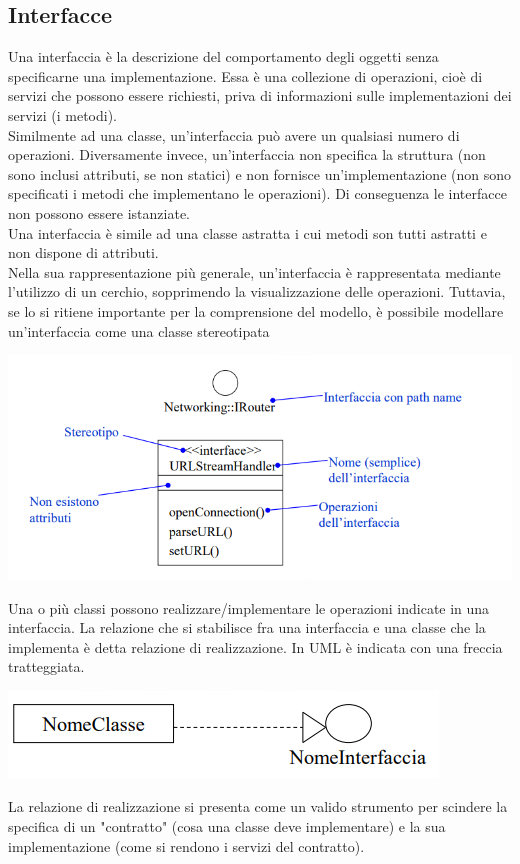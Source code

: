 \documentclass{article}
\begin{document}
	\subsection{Interfacce}
	Una interfaccia è la descrizione del comportamento degli oggetti senza specificarne una implementazione. Essa è una collezione di operazioni, cioè di servizi che possono essere richiesti, priva di informazioni sulle implementazioni dei servizi (i metodi).
	\vspace{\baselineskip} \\
	Similmente ad una classe, un'interfaccia può avere un qualsiasi numero di operazioni. Diversamente invece, un'interfaccia non specifica la struttura (non sono inclusi attributi, se non statici) e non fornisce un'implementazione (non sono specificati i metodi che implementano le operazioni). Di conseguenza le interfacce non possono essere istanziate.
	\vspace{\baselineskip} \\
	Una interfaccia è simile ad una classe astratta i cui metodi son tutti astratti e non dispone di attributi.
	\vspace{\baselineskip} \\
	Nella sua rappresentazione più generale, un'interfaccia è rappresentata mediante l'utilizzo di un cerchio, sopprimendo la visualizzazione delle operazioni. Tuttavia, se lo si ritiene importante per la comprensione del modello, è possibile modellare un'interfaccia come una classe stereotipata
	\begin{center}
		\includegraphics[scale=0.5]{assets/interfacce.png}
	\end{center}
	Una o più classi possono realizzare/implementare le operazioni indicate in una interfaccia. La relazione che si stabilisce fra una interfaccia e una classe che la implementa è detta relazione di realizzazione. In UML è indicata con una freccia tratteggiata.
	\begin{center}
		\includegraphics[scale=0.5]{assets/relazione_realizzazione_esempio.png}
	\end{center}
	La relazione di realizzazione si presenta come un valido strumento per scindere la specifica di un "contratto" (cosa una classe deve implementare) e la sua implementazione (come si rendono i servizi del contratto).
\end{document}
